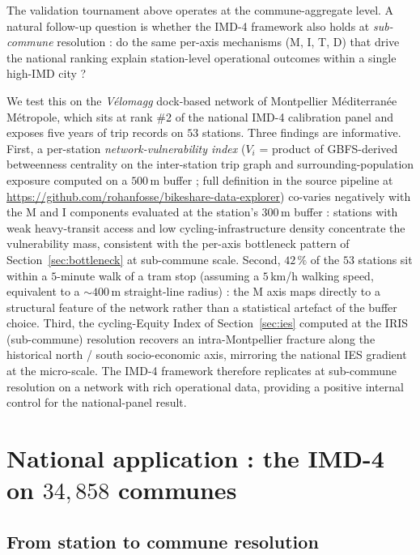 \documentclass[11pt,a4paper]{article}
\begin{document}
The validation tournament above operates at the
commune-aggregate level.  A natural follow-up question is whether
the IMD-4 framework also holds at \emph{sub-commune} resolution :
do the same per-axis mechanisms (M, I, T, D) that drive the
national ranking explain station-level operational outcomes
within a single high-IMD city ?

We test this on the \emph{V\'elomagg} dock-based network of
Montpellier M\'editerran\'ee M\'etropole, which sits at rank
\#2 of the national IMD-4 calibration panel and exposes five
years of trip records on $53$ stations.  Three findings are
informative.  First, a per-station \emph{network-vulnerability
index} ($V_i$ = product of GBFS-derived betweenness centrality
on the inter-station trip graph and surrounding-population
exposure computed on a $500$\,m buffer ; full definition in
the source pipeline at
\url{https://github.com/rohanfosse/bikeshare-data-explorer})
co-varies negatively with the M and I components evaluated at
the station's $300\,$m buffer : stations with weak heavy-transit
access and low cycling-infrastructure density concentrate the
vulnerability mass, consistent with the per-axis bottleneck
pattern of Section~\ref{sec:bottleneck} at sub-commune scale.  Second, $42\,\%$ of the $53$
stations sit within a $5$-minute walk of a tram stop (assuming
a $5$\,km/h walking speed, equivalent to a $\sim 400$\,m
straight-line radius) : the M axis maps directly to a structural
feature of the network rather than a statistical artefact of the
buffer choice.  Third,
the cycling-Equity Index of Section~\ref{sec:ies} computed at
the IRIS (sub-commune) resolution recovers an intra-Montpellier
fracture along the historical north / south socio-economic axis,
mirroring the national IES gradient at the micro-scale.  The
IMD-4 framework therefore replicates at sub-commune resolution
on a network with rich operational data, providing a positive
internal control for the national-panel result.

\section{National application : the IMD-4 on $34{,}858$ communes}
\label{sec:national}

\subsection{From station to commune resolution}
\end{document}
